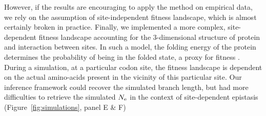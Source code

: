 However, if the results are encouraging to apply the method on empirical data, we rely on the assumption of site-independent fitness landscape, which is almost certainly broken in practice.
Finally, we implemented a more complex, site-dependent fitness landscape accounting for the $3$-dimensional structure of protein and interaction between sites.
In such a model, the folding energy of the protein determines the probability of being in the folded state, a proxy for fitness \citep{Goldstein2017}.
During a simulation, at a particular codon site, the fitness landscape is dependent on the actual amino-acids present in the vicinity of this particular site.
Our inference framework could recover the simulated branch length, but had more difficulties to retrieve the simulated $N_{\mathrm{e}}$ in the context of site-dependent epistasis (Figure~\ref{fig:simulations}, panel E \& F)

